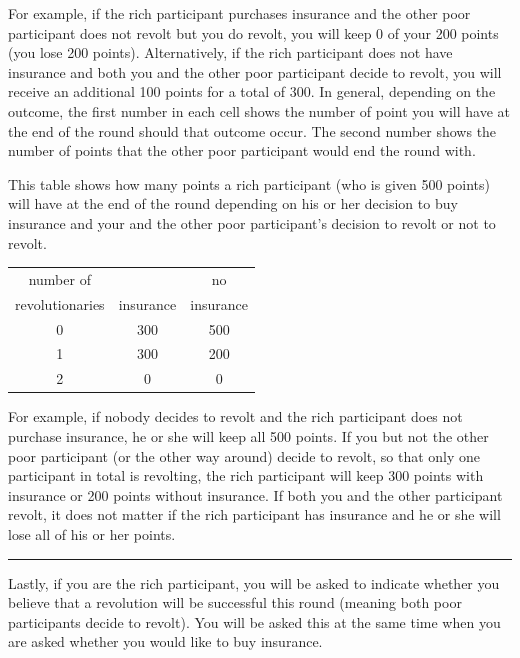 \documentclass[12pt]{article}
\begin{document}
	\bigskip
	For example, if the rich participant purchases insurance and the other poor 
	participant does not revolt but you do revolt, you will keep 0 of your 200 
	points (you lose 200 points). Alternatively, if the rich participant does 
	not have insurance and both you and the other poor participant decide to 
	revolt, you will receive an additional 100 points for a total of 300. In 
	general, depending on the outcome, the first number in each cell shows the 
	number of point you will have at the end of the round should that outcome 
	occur. The second number shows the number of points that the other poor 
	participant would end the round with.
	
	This table shows how many points a rich participant (who is given 500 
	points) will have at the end 
	of the round depending on his or her decision to buy insurance and your and 
	the other poor participant's decision to revolt or not to revolt.
	
	\begin{center}

	\begin{tabular}{|c||c|c|}
		\hline
		number of & & no\\
		revolutionaries & insurance & insurance\\
		\hline
		0 & 300 & 500\\
		\hline
		1 & 300 & 200\\
		\hline
		2 & 0 & 0\\
		\hline
	\end{tabular}
	\end{center}
	
	For example, if nobody decides to revolt and the rich participant does not 
	purchase insurance, he or she will keep all 500 points. If you but not the 
	other poor participant (or the other way around) decide to revolt, so that 
	only one participant in total is revolting, the rich participant will keep 
	300 points with insurance or 200 points without insurance. If both you and 
	the other participant revolt, it does not matter if the rich participant 
	has insurance and he or she will lose all of his or her points.
	
	\noindent\rule[0.5ex]{\linewidth}{1pt}
	
	Lastly, if you are the rich participant, you will be asked to indicate 
	whether 
	you believe that a revolution will be successful this round (meaning both 
	poor participants decide to revolt). You will be asked this at the same 
	time when you are asked whether you would like to buy insurance.
	
\end{document}
